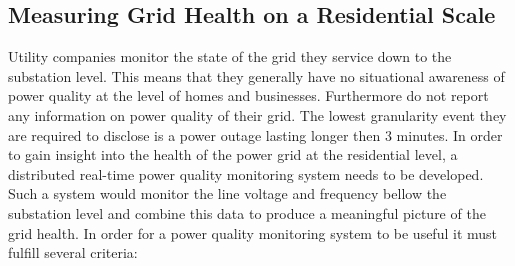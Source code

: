 \subsection{Measuring Grid Health on a Residential Scale}
Utility companies monitor the state of the grid they service down to the substation level. This means that they generally have no situational awareness of power quality at the
level of homes and businesses. Furthermore do not report any information on power quality of their grid. The lowest granularity event they are
required to disclose is a power outage lasting longer then 3 minutes. In order to gain insight into the health of the power grid at the residential level, a distributed
real-time power quality monitoring system needs to be developed. Such a system would monitor the line voltage and frequency bellow the substation level and combine
this data to produce a meaningful picture of the grid health. In order for a power quality monitoring system to be useful it must fulfill several criteria:

